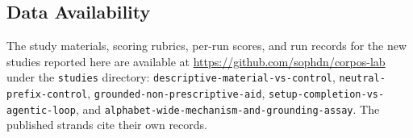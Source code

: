 \documentclass[11pt,a4paper]{article}
\begin{document}
\subsection{Data Availability}

The study materials, scoring rubrics, per-run scores, and run records for the new
studies reported here are available at \url{https://github.com/sophdn/corpos-lab} under
the \texttt{studies} directory: \texttt{descriptive-material-vs-control},
\texttt{neutral-prefix-control}, \texttt{grounded-non-prescriptive-aid},
\texttt{setup-completion-vs-agentic-loop}, and
\texttt{alphabet-wide-mechanism-and-grounding-assay}. The published strands cite their
own records.



\end{document}
